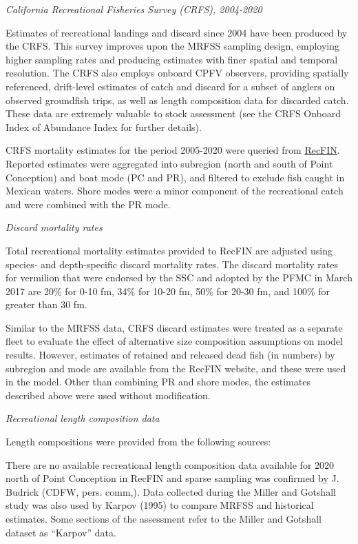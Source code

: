 \documentclass[
  english,
  a4paper,
]{article}
\begin{document}
\emph{California Recreational Fisheries Survey (CRFS), 2004-2020}

Estimates of recreational landings and discard since 2004 have been produced by
the CRFS. This survey improves upon the MRFSS sampling design, employing higher
sampling rates and producing estimates with finer spatial and temporal resolution. The CRFS also employs onboard CPFV observers, providing spatially referenced, drift-level estimates of catch and discard for a subset of anglers on observed groundfish trips, as well as length composition data for discarded catch. These data are extremely valuable to stock assessment (see the CRFS Onboard Index of Abundance Index for
further details).

CRFS mortality estimates for the period 2005-2020 were queried from \href{www.recfin.org}{RecFIN}.
Reported estimates were aggregated into subregion (north and south of Point Conception) and boat mode (PC and PR), and filtered to exclude fish
caught in Mexican waters. Shore modes were a minor component of the recreational catch and were combined with the PR mode.

\emph{Discard mortality rates}

Total recreational mortality estimates provided to RecFIN are
adjusted using species- and depth-specific discard mortality rates.
The discard mortality rates for vermilion that were endorsed by the
SSC and adopted by the
PFMC in March 2017 are 20\% for 0-10 fm, 34\% for 10-20 fm, 50\% for 20-30 fm, and
100\% for greater than 30 fm.

Similar to the MRFSS data, CRFS discard estimates were treated as a separate fleet to evaluate the effect of alternative size composition assumptions on model results. However, estimates of retained and released dead fish (in numbers) by subregion and mode are available from the RecFIN website, and these were used in the model. Other than combining PR and shore modes, the estimates described above were used without modification.

\emph{Recreational length composition data}

Length compositions were provided from the following sources:

There are no available recreational length composition data available for 2020 north
of Point Conception in RecFIN and sparse sampling was confirmed by J. Budrick (CDFW, pers. comm,).
Data collected during the Miller and Gotshall study was also used by Karpov (1995) to compare MRFSS and historical estimates. Some sections of the assessment refer to the Miller and Gotshall dataset as ``Karpov'' data.
\end{document}
